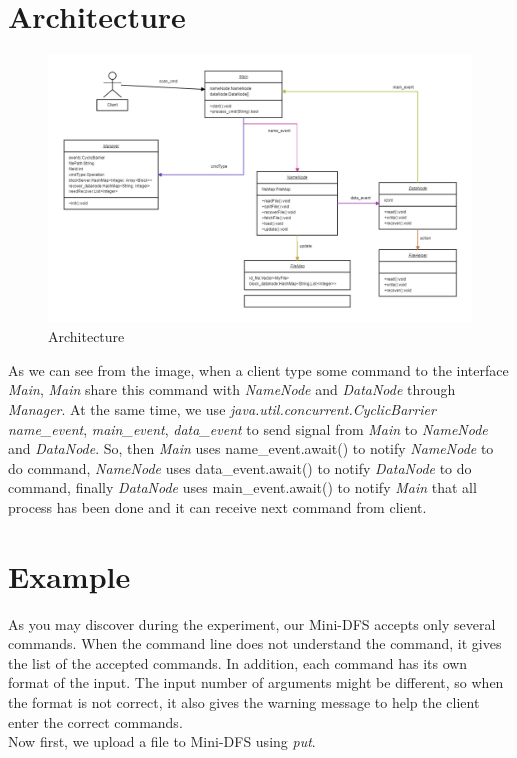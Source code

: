 \documentclass[10pt]{article}
\begin{document}
\section{Architecture}

\begin{figure}[H]
\centerline{\includegraphics[width = 1\textwidth]{screenshot//process.png}}
\caption{Architecture}
\label{fig_process}
\end{figure}

As we can see from the image, when a client type some command to the interface \textit{Main}, 
\textit{Main} share this command with \textit{NameNode} and \textit{DataNode} through \textit{Manager}.
 At the same time, we use \textit{java.util.concurrent.CyclicBarrier} \textit{name\_event}, 
 \textit{main\_event}, \textit{data\_event} to send signal from \textit{Main} to \textit{NameNode} and 
 \textit{DataNode}. So, then \textit{Main} uses name\_event.await() to notify \textit{NameNode} to do command, 
 \textit{NameNode} uses data\_event.await() to notify \textit{DataNode} to do command, finally \textit{DataNode} 
 uses main\_event.await() to notify \textit{Main} that all process has been done and it can receive next command from client.

\section{Example}

As you may discover during the experiment, our Mini-DFS accepts only several commands. When the command line does not understand 
the command, it gives the list of the accepted commands. In addition, each command has its own format of the input. The input number of 
arguments might be different, so when the format is not correct, it also gives the warning message to help the client enter the correct commands.\\ 
Now first, we upload a file to Mini-DFS using \textit{put}.
\end{document}
